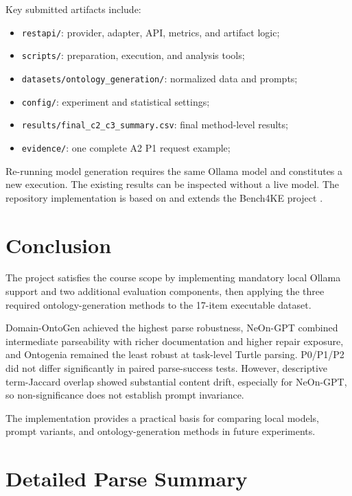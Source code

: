 \documentclass[11pt,a4paper]{article}
\newcommand{\code}[1]{\texttt{#1}}
\begin{document}
Key submitted artifacts include:

\begin{itemize}
  \item \code{restapi/}: provider, adapter, API, metrics, and artifact logic;
  \item \code{scripts/}: preparation, execution, and analysis tools;
  \item \code{datasets/ontology\_generation/}: normalized data and prompts;
  \item \code{config/}: experiment and statistical settings;
  \item \code{results/final\_c2\_c3\_summary.csv}: final method-level results;
  \item \code{evidence/}: one complete A2 P1 request example;
\end{itemize}

Re-running model generation requires the same Ollama model and constitutes a
new execution. The existing results can be inspected without a live model. The repository implementation is based on and
extends the Bench4KE project \cite{bench4ke_repository}.

\section{Conclusion}

The project satisfies the course scope by implementing mandatory local Ollama
support and two additional evaluation components, then applying the three
required ontology-generation methods to the 17-item executable dataset.

Domain-OntoGen achieved the highest parse robustness, NeOn-GPT combined
intermediate parseability with richer documentation and higher repair exposure,
and Ontogenia remained the least robust at task-level Turtle parsing. P0/P1/P2
did not differ significantly in paired parse-success tests. However, descriptive
term-Jaccard overlap showed substantial content drift, especially for NeOn-GPT,
so non-significance does not establish prompt invariance.

The implementation provides a practical basis for comparing local models,
prompt variants, and ontology-generation methods in future experiments.

\clearpage
\appendix

\section{Detailed Parse Summary}
\end{document}

